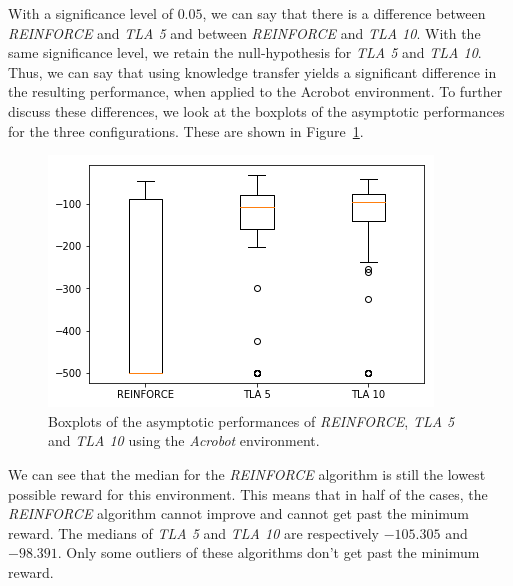 With a significance level of $0.05$, we can say that there is a difference between \textit{REINFORCE} and \textit{TLA 5} and between \textit{REINFORCE} and \textit{TLA 10}.
With the same significance level, we retain the null-hypothesis for \textit{TLA 5} and \textit{TLA 10}.
Thus, we can say that using knowledge transfer yields a significant difference in the resulting performance, when applied to the Acrobot environment.
To further discuss these differences, we look at the boxplots of the asymptotic performances for the three configurations. These are shown in Figure~\ref{fig:Acrobot:asymp_target_re-akt5-akt10}.
\begin{figure}[htb]
    \centering
    \includegraphics[width=.8\linewidth]{images/results/Acrobot/no_sparse_transfer/asymp_target_re-akt5-akt10.png}
    \caption{Boxplots of the asymptotic performances of \textit{REINFORCE}, \textit{TLA 5} and \textit{TLA 10} using the \textit{Acrobot} environment.}
    \label{fig:Acrobot:asymp_target_re-akt5-akt10}
\end{figure}
We can see that the median for the \textit{REINFORCE} algorithm is still the lowest possible reward for this environment. This means that in half of the cases, the \textit{REINFORCE} algorithm cannot improve and cannot get past the minimum reward. The medians of \textit{TLA 5} and \textit{TLA 10} are respectively $-105.305$ and $-98.391$. Only some outliers of these algorithms don't get past the minimum reward.


